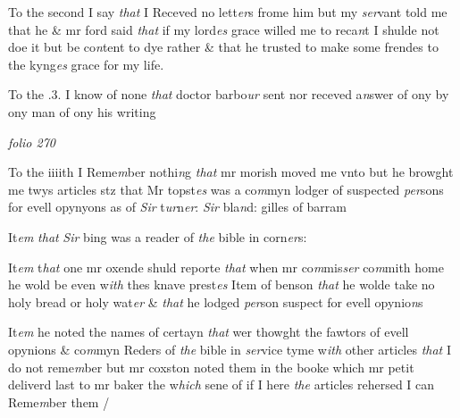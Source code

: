 \documentclass[12pt, a4paper]{book}
\begin{document}
            		
				\marginpar[\vspace{0.5cm}{\textcolor{Gray}{ford}}]{}
			

		\ifthenelse{\isodd{\thepage}}
		{\reversemarginpar}
		{\normalmarginpar}
		To the second I say \textit{that} I Receved no lett\textit{er}s frome him but my 
\textit{ ser}vant told me that he \& mr ford
			 said \textit{that} if my lord\textit{es} grace  willed me to reca\textit{n}t
I shulde not doe it but be co\textit{n}tent to dye rather \& that he trusted to 
make some frendes to the kyng\textit{es} grace for my life.

		\ifthenelse{\isodd{\thepage}}
		{\reversemarginpar}
		{\normalmarginpar}
		To the .3. I know of none \textit{that} doctor barbo\textit{ur} sent nor receved a\textit{n}swer 
of ony by ony man of ony his writing

\dotfill
						\newpage
{}

\textit{folio 270}



			
 	
		\ifthenelse{\isodd{\thepage}}
		{\reversemarginpar}
		{\normalmarginpar}
		To the iiiith I Reme\textit{m}ber nothi\textit{n}g \textit{that} mr morish moved me vnto but he
browght me twys articles stz that Mr topst\textit{es} was a co\textit{m}myn lodger
of suspected \textit{per}sons for evell opynyons as of \textit{Sir} t\textit{ur}n\textit{er}: \textit{Sir} bla\textit{n}d: gilles of barram

		\ifthenelse{\isodd{\thepage}}
		{\reversemarginpar}
		{\normalmarginpar}
		It\textit{em}
               \textit{that}
               \textit{Sir} bing was a reader of \textit{the} bible in corn\textit{er}s:

		\ifthenelse{\isodd{\thepage}}
		{\reversemarginpar}
		{\normalmarginpar}
		It\textit{em} t\textit{hat} one mr oxende shuld reporte \textit{that} when mr co\textit{m}mis\textit{ser} co\textit{m}mith home he
wold be even w\textit{ith} thes knave prest\textit{es}
Item of benson \textit{that} he wolde take no holy bread or holy wat\textit{er} \& \textit{that} he lodged \textit{per}son
suspect for evell opynio\textit{n}s

		\ifthenelse{\isodd{\thepage}}
		{\reversemarginpar}
		{\normalmarginpar}
		It\textit{em} he noted the names of certayn \textit{that} wer thowght the fawtors of
evell opynions \& co\textit{m}myn Reders of \textit{the} bible in \textit{ser}vice tyme w\textit{ith} other
articles \textit{that} I do not reme\textit{m}ber but mr coxston noted them in the
booke which mr petit deliverd last to mr baker the w\textit{hich}
               sene 
			of if I here \textit{the}
articles rehersed I can Reme\textit{m}ber them / 
\end{document}

